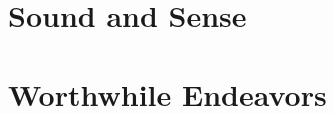 \documentclass[mode=\printmode,compress,xcolor=dvipsnames]{beamer}
\begin{document}
\section[Semantics]{Sound and Sense}
% 
% 
% 
% 
% 
\section[Worth]{Worthwhile Endeavors}
% 
% 
% 
% 
% 
% 
% 
% 
% 
\end{document}

